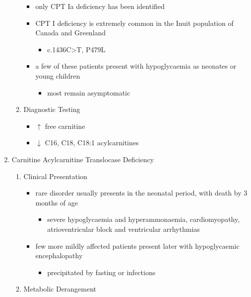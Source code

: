 \documentclass{scrartcl}
\begin{document}
\begin{enumerate}
\begin{enumerate}
\begin{itemize}
\item only CPT Ia deficiency has been identified
\item CPT I deficiency is extremely common in the Inuit population of Canada and Greenland
\begin{itemize}
\item c.1436C>T, P479L
\end{itemize}
\item a few of these patients present with hypoglycaemia as neonates or young children
\begin{itemize}
\item most remain asymptomatic
\end{itemize}
\end{itemize}

\item Diagnostic Testing
\label{sec:orgdff5d85}
\begin{itemize}
\item \(\uparrow\) free carnitine
\item \(\downarrow\) C16, C18, C18:1 acylcarnitines
\end{itemize}
\end{enumerate}

\item Carnitine Acylcarnitine Translocase Deficiency
\label{sec:org8799313}
\begin{enumerate}
\item Clinical Presentation
\label{sec:orgecda6a2}
\begin{itemize}
\item rare disorder usually presents in the neonatal period, with
death by 3 months of age
\begin{itemize}
\item severe hypoglycaemia and hyperammonaemia, cardiomyopathy,
atrioventricular block and ventricular arrhythmias
\end{itemize}
\item few more mildly affected patients present later with hypoglycaemic
encephalopathy
\begin{itemize}
\item precipitated by fasting or infections
\end{itemize}
\end{itemize}
\item Metabolic Derangement
\label{sec:orge3ea8b6}
\end{enumerate}


\end{enumerate}
\end{document}
